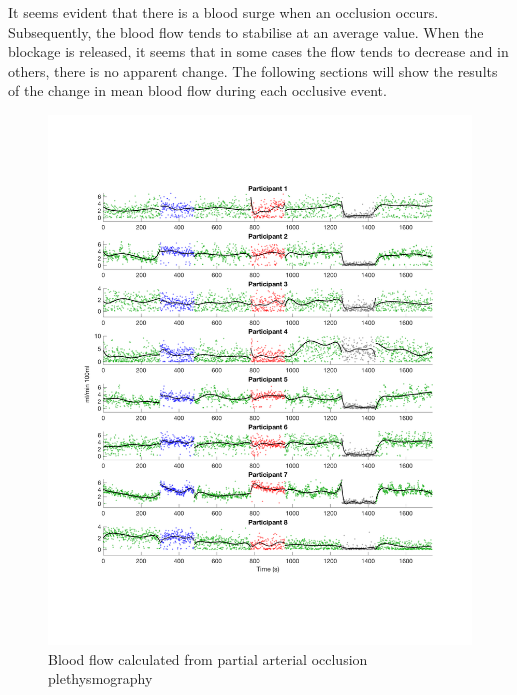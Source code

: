 It seems evident that there is a blood surge when an occlusion occurs. Subsequently, the blood flow tends to stabilise at an average value. When the blockage is released, it seems that in some cases the flow tends to decrease and in others, there is no apparent change. The following sections will show the results of the change in mean blood flow during each occlusive event.

\begin{figure}[!htbp]
	\includegraphics[width=\textwidth,height=\textheight,keepaspectratio]{figure15}    
	\caption{Blood flow calculated from partial arterial occlusion plethysmography}
	\label{fig:blood_flow_plethysmography}
\end{figure}


